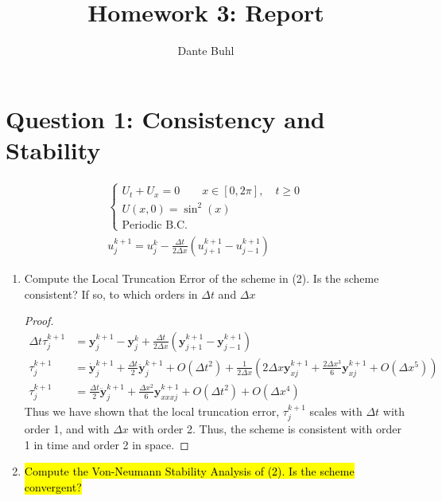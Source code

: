 \documentclass{article}
\title{Homework 3: Report}
\author{Dante Buhl}
\begin{document}
\newcommand{\bs}[1]{\boldsymbol{#1}}
\newcommand{\bmp}[1]{\begin{minipage}{#1\textwidth}}
\newcommand{\emp}{\end{minipage}}
\newcommand{\R}{\mathbb{R}}
\newcommand{\C}{\mathbb{C}}
\newcommand{\N}{\mathcal{N}}
\newcommand{\I}{\mathrm{I}}
\newcommand{\K}{\bs{\mathrm{K}}}
\newcommand{\m}{\bs{\mu}_*}
\newcommand{\s}{\bs{\Sigma}_*}
\newcommand{\dt}{\Delta t}
\newcommand{\dx}{\Delta x}
\newcommand{\tr}[1]{\text{Tr}(#1)}
\newcommand{\Tr}[1]{\text{Tr}(#1)}
\newcommand{\pd}[2]{\frac{\partial #1}{\partial #2}}

\maketitle

\section*{Question 1: Consistency and Stability}
    \begin{align}
        \begin{cases}
            U_t + U_x = 0 \quad \quad x \in [0, 2\pi],
            \quad t \ge 0\\
            U(x,0) = \sin^2(x)\\
            \text{Periodic B.C.}
        \end{cases} \\
        u_j^{k+1} = u_j^k - \frac{\dt}{2\dx}(u_{j+1}^{k+1} - u_{j-1}^{k+1})
    \end{align}

\begin{enumerate}[label=\alph*)]

    \item Compute the Local Truncation Error of the scheme in (2). Is the scheme
    consistent? If so, to which orders in $\dt$ and $\dx$
    \begin{proof}
        \begin{align*}
            \dt \tau_j^{k+1} &= \bs{y}_j^{k+1} - \bs{y}_j^k + \frac{\dt}{2\dx}(\bs{y}_{j+1}^{k+1}
            - \bs{y}_{j-1}^{k+1})\\
            \tau_j^{k+1} &= \dot{\bs{y}}_j^{k+1} + \frac{\dt}{2}\ddot{\bs{y}}_j^{k+1} +
            O(\dt^2) + 
            \frac{1}{2\dx}(2\dx \bs{y}_{x j}^{k+1} + \frac{2\dx^3}{6} \bs{y}_{x j}^{k+1}
            +O(\dx^5))\\
            \tau_j^{k+1} &= \frac{\dt}{2}\ddot{\bs{y}}_j^{k+1} +
            \frac{\dx^2}{6} \bs{y}_{xxx j}^{k+1} + O(\dt^2)+O(\dx^4) 
        \end{align*}
        Thus we have shown that the local truncation error, $\tau_j^{k+1}$
        scales with $\dt$ with order 1, and with $\dx$ with order 2. Thus, the
        scheme is consistent with order 1 in time and order 2 in space. 
    \end{proof}

    \item \hl{Compute the Von-Neumann Stability Analysis of (2). Is the scheme
    convergent?}
\end{enumerate}
\end{document}
